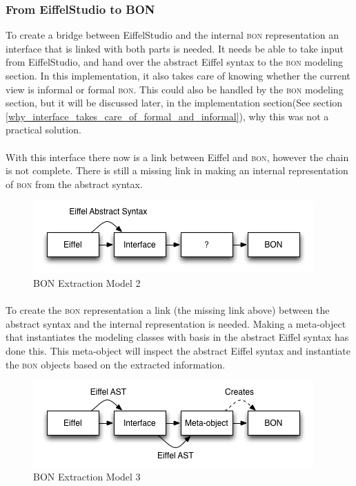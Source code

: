 \subsubsection{From EiffelStudio to BON}
To create a bridge between EiffelStudio and the internal \textsc{bon} representation an interface that is linked with both parts is needed. It needs be able to take input from EiffelStudio, and hand over the abstract Eiffel syntax to the \textsc{bon} modeling section. In this implementation, it also takes care of knowing whether the current view is informal or formal \textsc{bon}. This could also be handled by the \textsc{bon} modeling section, but it will be discussed later, in the implementation section(See section \ref{why_interface_takes_care_of_formal_and_informal}), why this was not a practical solution.

\paragraph{}
With this interface there now is a link between Eiffel and \textsc{bon}, however the chain is not complete. There is still a missing link in making an internal representation of \textsc{bon} from the abstract syntax.
\begin{figure}[H]
\centering
\includegraphics[scale=0.8]{images/BON-extraction-model-2.png}
\caption{BON Extraction Model 2}
\label{fig:bon_extraction_2}
\end{figure}

\paragraph{}
To create the \textsc{bon} representation a link (the missing link above) between the abstract syntax and the internal representation is needed. Making a meta-object that instantiates the modeling classes with basis in the abstract Eiffel syntax has done this. This meta-object will inspect the abstract Eiffel syntax and instantiate the \textsc{bon} objects based on the extracted information.
\begin{figure}[H]
\centering
\includegraphics[scale=0.8]{images/BON-extraction-model-3.png}
\caption{BON Extraction Model 3}
\label{fig:bon_extraction_3}
\end{figure}

